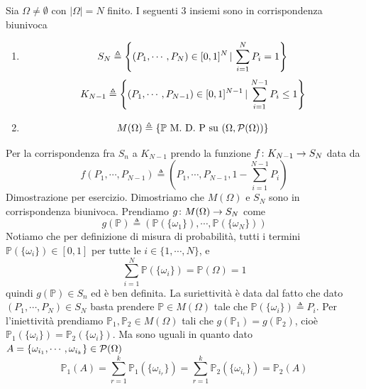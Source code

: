 \documentclass[a4paper]{article}
\begin{document}
\begin{snippetproposition}{}
    Sia \(\Omega \neq \emptyset\) con \(|\Omega| = N\) finito.
    I seguenti 3 insiemi sono in corrispondenza biunivoca
    \begin{enumerate}
        \item \[
                S_N \triangleq \left\{
                    (P_1, \cdots, P_N) \in [0,1]^N \,|\, \sum_{i=1}^N P_i = 1
                \right\}
            \]
            \[
                K_{N-1} \triangleq \left\{
                    (P_1, \cdots, P_{N-1})
                    \in [0,1]^{N-1} \,|\, \sum_{i=1}^{N-1} P_i \leq 1
                \right\}
            \]
        \item \[
                M(\Omega) \triangleq \left\{
                    \mathbb P \text{ M. D. P su } (\Omega, \mathcal P(\Omega))
                \right\}
            \]
    \end{enumerate}
\end{snippetproposition}

\begin{snippetproof}{}
    Per la corrispondenza fra \(S_n\) a \(K_{N-1}\)
    prendo la funzione \(f \colon K_{N-1} \to S_N\) data da
    \[
        f(P_1, \cdots, P_{N-1}) \triangleq \left(P_1, \cdots, P_{N-1}, 1- \sum_{i=1}^{N-1} P_i \right)
    \]
    Dimostrazione per esercizio.
    Dimostriamo che \(M(\Omega)\) e \(S_N\) sono in corrispondenza biunivoca.
    Prendiamo \(g \colon M(\Omega) \to S_N\) come
    \[
        g(\mathbb P) \triangleq (
            \mathbb P(\{\omega_1\}),
            \cdots,
            \mathbb P(\{\omega_N\})
        )
    \]
    Notiamo che per definizione di misura di probabilità,
    tutti i termini \(\mathbb P(\{\omega_i\}) \in [0,1]\) per tutte le \(i \in \{1, \cdots, N\}\),
    e \[
        \sum_{i=1}^N \mathbb P(\{\omega_i\}) = \mathbb P(\Omega) = 1
    \]
    quindi \(g(\mathbb P) \in S_n\) ed è ben definita.
    La suriettività è data dal fatto che dato \((P_1, \cdots, P_N) \in S_N\)
    basta prendere \(\mathbb P \in M(\Omega)\) tale che
    \(\mathbb P (\{\omega_i\}) \triangleq P_i\).
    Per l'iniettività prendiamo \(\mathbb P_1, \mathbb P_2 \in M(\Omega)\)
    tali che \(g(\mathbb P_1) = g(\mathbb P_2)\), cioè \(\mathbb P_1(\{\omega_i\}) = \mathbb P_2(\{\omega_i\})\).
    Ma sono uguali in quanto dato \(A = \{\omega_{i_1}, \cdots, \omega_{i_k}\} \in \mathcal P(\Omega)\)
    \[
        \mathbb P_1(A)
        = \sum_{r=1}^k \mathbb P_1(\{\omega_{i_r}\})=
        \sum_{r=1}^k \mathbb P_2(\{\omega_{i_r}\})
        = \mathbb P_2(A)
    \]
\end{snippetproof}
\end{document}
